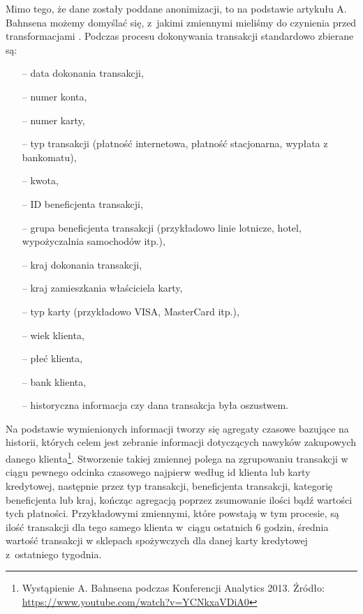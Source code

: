 \documentclass[inzynierska]{pwr_wmat_praca_dyplomowa}
\theoremstyle{plain}
\numberwithin{theorem}{chapter}
\theoremstyle{definition}
\numberwithin{theorem}{chapter}
\begin{document}
Mimo tego, że dane zostały poddane anonimizacji, to na podstawie artykułu A. Bahnsena możemy domyślać się, z~jakimi zmiennymi mieliśmy do czynienia przed transformacjami \cite{CSCCFD}. Podczas procesu dokonywania transakcji standardowo zbierane są: 
\begin{itemize}
	\item[--] data dokonania transakcji, 
	\item[--] numer konta,
	\item[--] numer karty,
	\item[--] typ transakcji (płatność internetowa, płatność stacjonarna, wypłata z bankomatu),
	\item[--] kwota, 
	\item[--] ID beneficjenta transakcji,
	\item[--] grupa beneficjenta transakcji (przykładowo linie lotnicze, hotel, wypożyczalnia samochodów itp.), 
	\item[--] kraj dokonania transakcji,
	\item[--] kraj zamieszkania właściciela karty,
	\item[--] typ karty (przykładowo VISA, MasterCard itp.),
	\item[--] wiek klienta, 
 	\item[--] płeć klienta,
	\item[--] bank klienta,
	\item[--] historyczna informacja czy dana transakcja była oszustwem.
\end{itemize}
\noindent Na podstawie wymienionych informacji tworzy się agregaty czasowe bazujące na historii, których celem jest zebranie informacji dotyczących nawyków zakupowych danego klienta\footnote{Wystąpienie A. Bahnsena podczas Konferencji Analytics 2013. Źródło: \url{https://www.youtube.com/watch?v=YCNkxaVDiA0}}. Stworzenie takiej zmiennej polega na zgrupowaniu transakcji w ciągu pewnego odcinka czasowego najpierw według id klienta lub karty kredytowej, następnie przez typ transakcji, beneficjenta transakcji, kategorię beneficjenta lub kraj, kończąc agregacją poprzez zsumowanie ilości bądź wartości tych płatności. Przykładowymi zmiennymi, które powstają w tym procesie, są ilość transakcji dla tego samego klienta w~ciągu ostatnich 6 godzin, średnia wartość transakcji w sklepach spożywczych dla danej karty kredytowej z~ostatniego tygodnia. 
\end{document}
